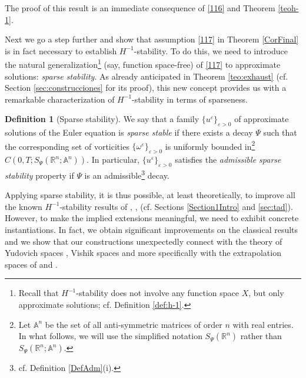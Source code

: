 \documentclass[11pt, a4paper,leqno]{amsart}
\theoremstyle{plain}
\newtheorem{corollary}{Corollary}
\numberwithin{equation}{section}
\theoremstyle{definition}
\newtheorem{definition}{Definition}
\theoremstyle{remark}
\def\R{\mathbb{R}}
\begin{document}
The proof of this result is an immediate consequence of \eqref{116} and Theorem \ref{teoh-1}. 

Next we go a step further  and show that assumption \eqref{117} in Theorem \ref{CorFinal} is in fact necessary to establish $H^{-1}$-stability.  To do this, we need to introduce the natural generalization\footnote{Recall that $H^{-1}$-stability does not involve any function space $X$, but only approximate solutions; cf. Definition \ref{def:h-1}.} (say, function space-free) of \eqref{117} to approximate solutions: \emph{sparse stability}. As already anticipated in Theorem \ref{teo:exhaust} (cf. Section \ref{sec:construcciones} for its proof),  this new concept provides us with  a remarkable characterization of $H^{-1}$-stability in terms of sparseness.  


\begin{definition}[Sparse stability]
We
say that a family $\{u^{\varepsilon}\}_{\varepsilon>0}$ of approximate
solutions of the Euler equation is \emph{sparse stable} if there exists a decay $\Psi$ such that the corresponding
set of vorticities $\{\omega^{\varepsilon}\}_{\varepsilon > 0}$ is uniformly bounded
in\footnote{Let $\mathbb{A}^{n}$ be the set of all anti-symmetric matrices of
order $n$ with real entries. In what follows, we will use the simplified notation $S_\Psi(\R^n)$ rather than $S_\Psi(\mathbb{R}
^{n};\mathbb{A}^{n})$.} $C(0,T;S_\Psi(\mathbb{R}%
^{n};\mathbb{A}^{n}))$. In particular,  $\{u^\varepsilon\}_{\varepsilon > 0}$ satisfies the \emph{admissible sparse stability} property if  $\Psi$ is an admissible\footnote{cf. Definition \ref{DefAdm}(i).} decay. 
\end{definition}



%

Applying sparse stability, it is thus possible, at least
theoretically, to improve all the known $H^{-1}$-stability results of
\cite{DiPernaMajda}, \cite{LNT}, \cite{Tadmor} (cf. Sections \ref{Section1Intro} and \ref{sec:tad}). However, to make the implied
extensions meaningful, we need to exhibit concrete instantiations.  In fact, we obtain significant improvements on the
classical results  and we show that our constructions
unexpectedly connect with the theory of Yudovich spaces \cite{Y95}, Vishik
spaces \cite{V99} and more specifically with the extrapolation spaces of
\cite{JM91} and \cite{DMEuler}.
\end{document}
